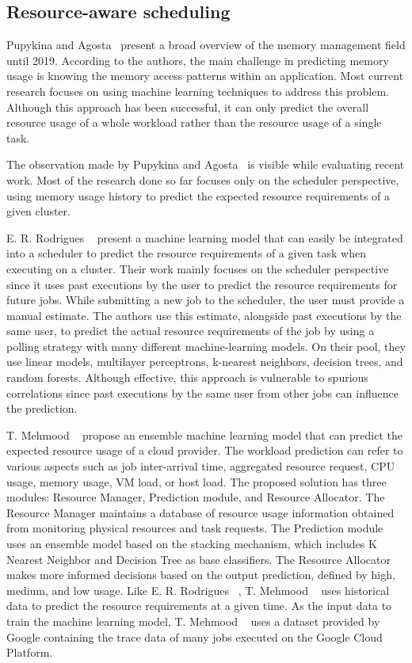 \subsection{Resource-aware scheduling}
\label{subsec:resource-aware-scheduling}

Pupykina and Agosta~\cite{pupykina2019} present a broad overview of the memory management field until 2019.
According to the authors, the main challenge in predicting memory usage is knowing the memory access patterns within an application.
Most current research focuses on using machine learning techniques to address this problem.
Although this approach has been successful, it can only predict the overall resource usage of a whole workload rather than the resource usage of a single task.

The observation made by Pupykina and Agosta~\cite{pupykina2019} is visible while evaluating recent work.
Most of the research done so far focuses only on the scheduler perspective, using memory usage history to predict the expected resource requirements of a given cluster.

E. R. Rodrigues \etal~\cite{rodrigues2016} present a machine learning model that can easily be integrated into a scheduler to predict the resource requirements of a given task when executing on a cluster.
Their work mainly focuses on the scheduler perspective since it uses past executions by the user to predict the resource requirements for future jobs.
While submitting a new job to the scheduler, the user must provide a manual estimate.
The authors use this estimate, alongside past executions by the same user, to predict the actual resource requirements of the job by using a polling strategy with many different machine-learning models.
On their pool, they use linear models, multilayer perceptrons, k-nearest neighbors, decision trees, and random forests.
Although effective, this approach is vulnerable to spurious correlations since past executions by the same user from other jobs can influence the prediction.

T. Mehmood \etal~\cite{mehmood2018} propose an ensemble machine learning model that can predict the expected resource usage of a cloud provider.
The workload prediction can refer to various aspects such as job inter-arrival time, aggregated resource request, CPU usage, memory usage, VM load, or host load. 
The proposed solution has three modules: Resource Manager, Prediction module, and Resource Allocator.
The Resource Manager maintains a database of resource usage information obtained from monitoring physical resources and task requests.
The Prediction module uses an ensemble model based on the stacking mechanism, which includes K Nearest Neighbor and Decision Tree as base classifiers.
The Resource Allocator makes more informed decisions based on the output prediction, defined by high, medium, and low usage.
Like E. R. Rodrigues \etal~\cite{rodrigues2016}, T. Mehmood \etal~\cite{mehmood2018} uses historical data to predict the resource requirements at a given time.
As the input data to train the machine learning model, T. Mehmood \etal~\cite{mehmood2018} uses a dataset provided by Google containing the trace data of many jobs executed on the Google Cloud Platform.

